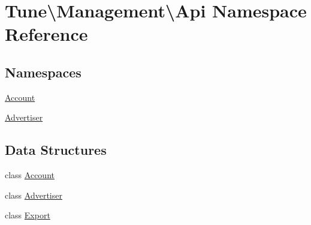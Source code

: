 \hypertarget{namespaceTune_1_1Management_1_1Api}{\section{Tune\textbackslash{}Management\textbackslash{}Api Namespace Reference}
\label{namespaceTune_1_1Management_1_1Api}
}
\subsection*{Namespaces}
\begin{DoxyCompactItemize}
\item 
\hyperlink{namespaceTune_1_1Management_1_1Api_1_1Account}{Account}
\item 
\hyperlink{namespaceTune_1_1Management_1_1Api_1_1Advertiser}{Advertiser}
\end{DoxyCompactItemize}
\subsection*{Data Structures}
\begin{DoxyCompactItemize}
\item 
class \hyperlink{classTune_1_1Management_1_1Api_1_1Account}{Account}
\item 
class \hyperlink{classTune_1_1Management_1_1Api_1_1Advertiser}{Advertiser}
\item 
class \hyperlink{classTune_1_1Management_1_1Api_1_1Export}{Export}
\end{DoxyCompactItemize}
